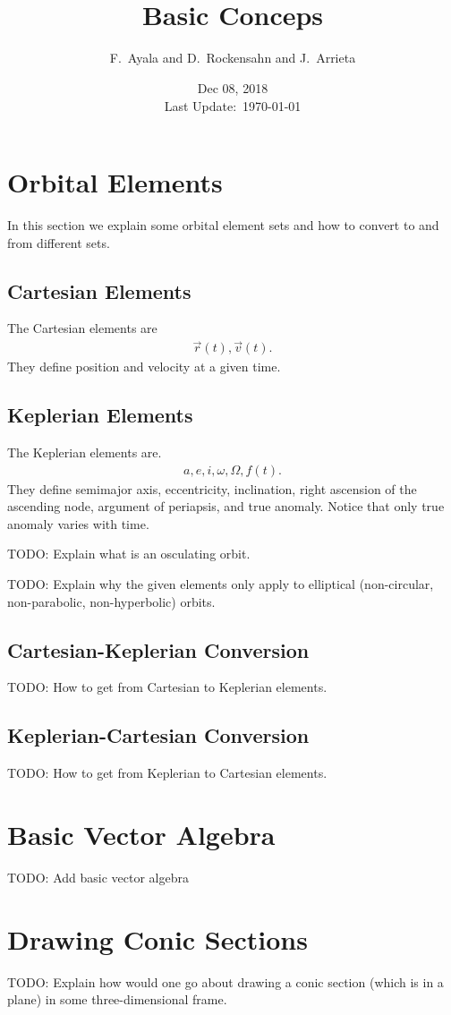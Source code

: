 \documentclass[fleqn]{article}
\title{\mxd\\Basic Conceps}
\author{F.~Ayala and D.~Rockensahn and J.~Arrieta}
\date{Dec 08, 2018\\\small{Last Update:~\today}}
\begin{document}
\maketitle


\section{Orbital Elements}
In this section we explain some orbital element sets and how to convert to and
from different sets.
\subsection{Cartesian Elements}
The Cartesian elements are
\begin{align}
  \vec{r}(t), \vec{v}(t).
\end{align}
They define position and velocity at a given time.

\subsection{Keplerian Elements}
The Keplerian elements are.
\begin{align}
  a, e, i, \omega, \Omega, f(t).
\end{align}
They define semimajor axis, eccentricity, inclination, right ascension of the
ascending node, argument of periapsis, and true anomaly. Notice that only true
anomaly varies with time.

TODO: Explain what is an osculating orbit.

TODO: Explain why the given elements only apply to elliptical (non-circular,
non-parabolic, non-hyperbolic) orbits.

\subsection{Cartesian-Keplerian Conversion}
TODO: How to get from Cartesian to Keplerian elements.

\subsection{Keplerian-Cartesian Conversion}
TODO: How to get from Keplerian to Cartesian elements.

\section{Basic Vector Algebra}
TODO: Add basic vector algebra

\section{Drawing Conic Sections}
TODO: Explain how would one go about drawing a conic section (which is in a
plane) in some three-dimensional frame.
\end{document}
